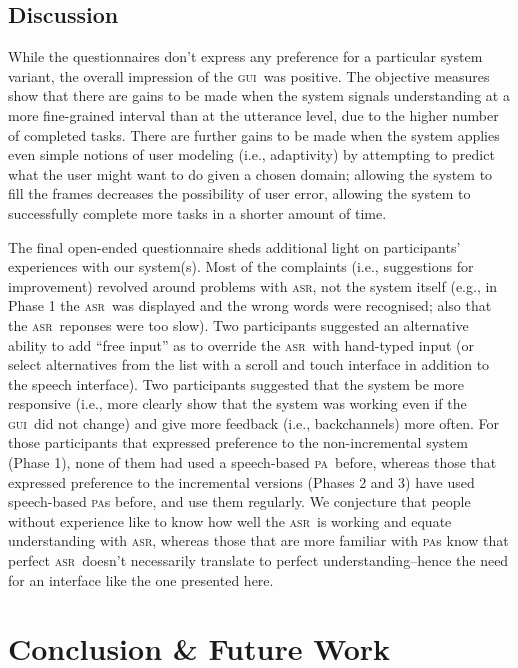 \documentclass[11pt]{article}
\newcommand{\asr}[0]{\textsc{asr}}
\newcommand{\ui}[0]{\textsc{gui}}
\newcommand{\pa}[0]{\textsc{pa}}
\begin{document}
\subsection{Discussion}

While the questionnaires don't express any preference for a particular system variant, the overall impression of the \ui\ was positive. The objective measures show that there are gains to be made when the system signals understanding at a more fine-grained interval than at the utterance level, due to the higher number of completed tasks. There are further gains to be made when the system applies even simple notions of user modeling (i.e., adaptivity) by attempting to predict what the user might want to do given a chosen domain; allowing the system to fill the frames decreases the possibility of user error, allowing the system to successfully complete more tasks in a shorter amount of time. 

The final open-ended questionnaire sheds additional light on participants' experiences with our system(s). Most of the complaints (i.e., suggestions for improvement) revolved around problems with \asr, not the system itself (e.g., in Phase 1 the \asr\ was displayed and the wrong words were recognised; also that the \asr\ reponses were too slow). Two participants suggested an alternative ability to add ``free input'' as to override the \asr\ with hand-typed input (or select alternatives from the list with a scroll and touch interface in addition to the speech interface). Two participants suggested that the system be more responsive (i.e., more clearly show that the system was working even if the \ui\ did not change) and give more feedback (i.e., backchannels) more often. For those participants that expressed preference to the non-incremental system (Phase 1), none of them had used a speech-based \pa\ before, whereas those that expressed preference to the incremental versions (Phases 2 and 3) have used speech-based \pa s before, and use them regularly. We conjecture that people without experience like to know how well the \asr\ is working and equate understanding with \asr, whereas those that are more familiar with \pa s know that perfect \asr\ doesn't necessarily translate to perfect understanding--hence the need for an interface like the one presented here. 

\section{Conclusion \& Future Work}
\end{document}
